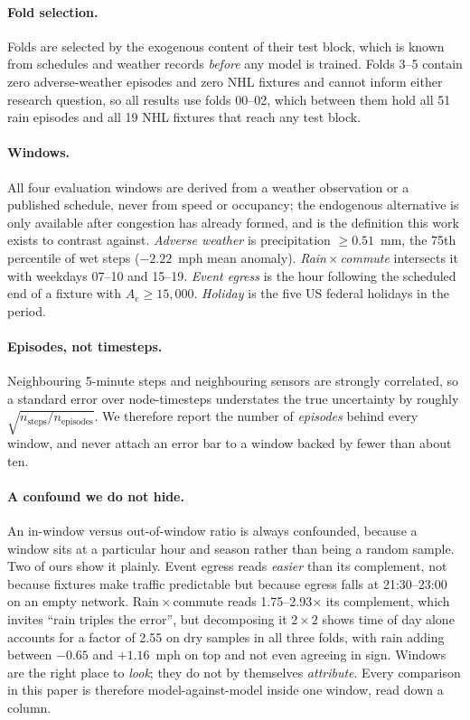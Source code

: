 \documentclass[letterpaper]{article}
\begin{document}
\paragraph{Fold selection.} Folds are selected by the exogenous content of their test block, which is known from schedules and weather records \emph{before} any model is trained. Folds 3--5 contain zero adverse-weather episodes and zero NHL fixtures and cannot inform either research question, so all results use folds 00--02, which between them hold all 51 rain episodes and all 19 NHL fixtures that reach any test block.

\paragraph{Windows.} All four evaluation windows are derived from a weather observation or a published schedule, never from speed or occupancy; the endogenous alternative is only available after congestion has already formed, and is the definition this work exists to contrast against.
\emph{Adverse weather} is precipitation $\ge 0.51$~mm, the 75th percentile of wet steps ($-2.22$~mph mean anomaly). \emph{Rain\,$\times$\,commute} intersects it with weekdays 07--10 and 15--19. \emph{Event egress} is the hour following the scheduled end of a fixture with $A_e\ge15{,}000$. \emph{Holiday} is the five US federal holidays in the period.

\paragraph{Episodes, not timesteps.} Neighbouring 5-minute steps and neighbouring sensors are strongly correlated, so a standard error over node-timesteps understates the true uncertainty by roughly $\sqrt{n_{\text{steps}}/n_{\text{episodes}}}$. We therefore report the number of \emph{episodes} behind every window, and never attach an error bar to a window backed by fewer than about ten.

\paragraph{A confound we do not hide.} An in-window versus out-of-window ratio is always confounded, because a window sits at a particular hour and season rather than being a random sample. Two of ours show it plainly. Event egress reads \emph{easier} than its complement, not because fixtures make traffic predictable but because egress falls at 21:30--23:00 on an empty network. Rain\,$\times$\,commute reads 1.75--2.93$\times$ its complement, which invites ``rain triples the error'', but decomposing it $2\times2$ shows time of day alone accounts for a factor of 2.55 on dry samples in all three folds, with rain adding between $-0.65$ and $+1.16$~mph on top and not even agreeing in sign. Windows are the right place to \emph{look}; they do not by themselves \emph{attribute}. Every comparison in this paper is therefore model-against-model inside one window, read down a column.
\end{document}
